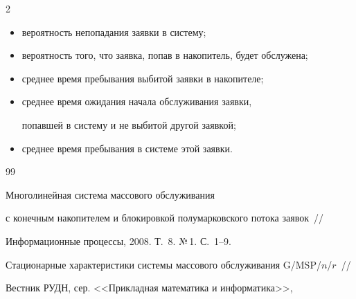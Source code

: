 \begin{multicols}{2}
\begin{itemize}
\item


 вероятность непопадания заявки в систему;


\item


 вероятность того, что заявка, попав в накопитель, будет обслужена;


\item


 среднее время пребывания выбитой заявки в накопителе;


\item


 среднее время ожидания начала обслуживания заявки,


попавшей в систему и не выбитой другой заявкой;


\item


 среднее время пребывания в системе этой за\-явки.


\end{itemize}










{\small\frenchspacing


{%




\begin{thebibliography}{99}












Многолинейная система массового обслуживания


с конечным накопителем и блокировкой полумарковского потока заявок~//


Информационные процессы, 2008. Т.~8. №\,1.  С.~1--9.









Стационарные характеристики системы массового обслуживания G/MSP/$n$/$r$~//


Вестник РУДН, сер. <<Прикладная математика и информатика>>,



\end{thebibliography}}}
\end{multicols}
